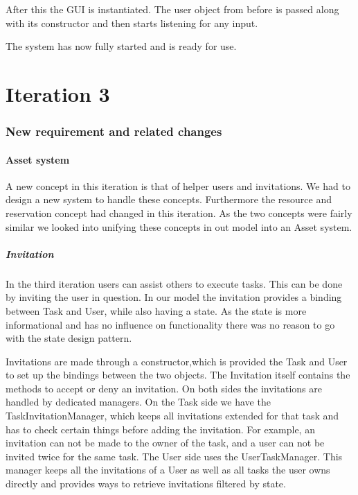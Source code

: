 	After this the GUI is instantiated. The user object from before is passed along with its constructor and then starts listening for any input. 
	
	The system has now fully started and is ready for use.	
	
	\newpage
	\part{Iteration 3}
	
		\section{New requirement and related changes}
		\subsection{Asset system}
			A new concept in this iteration is that of helper users and invitations. We had to design a new system to handle these concepts. Furthermore the resource and reservation concept had changed in this iteration. As the two concepts were fairly similar we looked into unifying these concepts in out model into an Asset system.
			\subsubsection{Invitation}
				In the third iteration users can assist others to execute tasks. This can be done by inviting the user in question. In our model the invitation provides a binding between Task and User, while also having a state. As the state is more informational and has no influence on functionality there was no reason to go with the state design pattern. 
				
				Invitations are made through a constructor,which is provided the Task and User to set up the bindings between the two objects. The Invitation itself contains the methods to accept or deny an invitation. On both sides the invitations are handled by dedicated managers. On the Task side we have the TaskInvitationManager, which keeps all invitations extended for that task and has to check certain things before adding the invitation. For example, an invitation can not be made to the owner of the task, and a user can not be invited twice for the same task. The User side uses the UserTaskManager. This manager keeps all the invitations of a User as well as all tasks the user owns directly and provides ways to retrieve invitations filtered by state.
				
